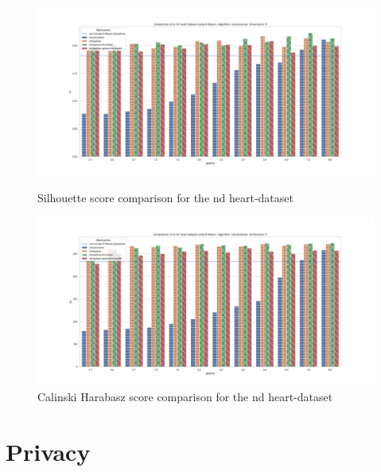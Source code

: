 \begin{figure}[H]
    \centering
    \begin{minipage}[c]{0.8\textwidth}
        \includegraphics[width=1\textwidth]{Results/RQ2-nd/heart-dataset/sc_heart-dataset_comparison.png}
        \caption{Silhouette score comparison for the nd heart-dataset}
        \label{fig:appendix-sc_heart-dataset_comparison_nd}
    \end{minipage}
    \begin{minipage}[c]{0.8\textwidth}
        \includegraphics[width=1\textwidth]{Results/RQ2-nd/heart-dataset/ch_heart-dataset_comparison.png}
        \caption{Calinski Harabasz score comparison for the nd heart-dataset}
        \label{fig:appendix-ch_heart-dataset_comparison_nd}
    \end{minipage}

\end{figure}
\section{Privacy} \label{appendix:privacy}
